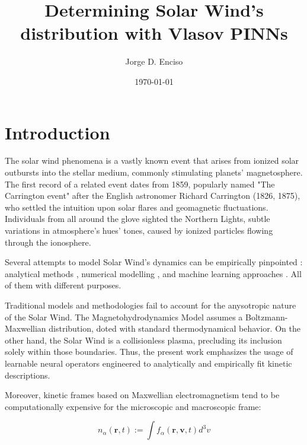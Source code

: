 \documentclass[12pt]{article}
\title{Determining Solar Wind's distribution with Vlasov PINNs}
\author{Jorge D. Enciso}
\date{\today}
\begin{document}
\maketitle

\begin{abstract}
\end{abstract}

\tableofcontents
\newpage

\section{Introduction}

The solar wind phenomena is a vastly known event that arises from ionized solar outbursts into the stellar medium, commonly stimulating planets' magnetosphere. \cite{Gosling2007} The first record of a related event dates from 1859, popularly named "The Carrington event" after the English astronomer Richard Carrington (1826, 1875), who settled the intuition upon solar flares and geomagnetic fluctuations. Individuals from all around the glove sighted the Northern Lights, subtle variations in atmosphere's hues' tones, caused by ionized particles flowing through the ionosphere.

Several attempts to model Solar Wind's dynamics can be empirically pinpointed : analytical methods \cite{BLUME202396}, numerical modelling \cite{10.3389/fspas.2023.1105797, windmodelling1, Gombosi_2018}, and machine learning approaches \cite{comp_2, comp_3, guastavino2024forecastinggeoffectiveeventssolar, sabbatini2023solarwindspeedestimate, https://doi.org/10.1029/2023SW003561}. All of them with different purposes.

Traditional models and methodologies fail to account for the anysotropic nature of the Solar Wind. The Magnetohydrodynamics Model assumes a Boltzmann-Maxwellian distribution, doted with standard thermodynamical behavior. On the other hand, the Solar Wind is a collisionless plasma, precluding its inclusion solely within those boundaries. Thus, the present work emphasizes the usage of learnable neural operators engineered to analytically and empirically fit kinetic descriptions.

Moreover, kinetic frames based on Maxwellian electromagnetism tend to be computationally expensive for the microscopic and macroscopic frame:

\begin{equation}
    n_{\alpha} (\mathbf{r}, t) := \int f_{\alpha}(\mathbf{r}, \mathbf{v}, t) d^3v
\end{equation}
\end{document}
